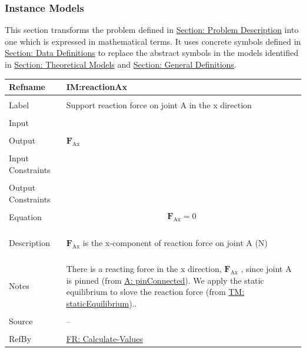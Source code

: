 \documentclass[12pt]{article}
\begin{document}
\subsubsection{Instance Models}
\label{Sec:IMs}
This section transforms the problem defined in \hyperref[Sec:ProbDesc]{Section: Problem Description} into one which is expressed in mathematical terms. It uses concrete symbols defined in \hyperref[Sec:DDs]{Section: Data Definitions} to replace the abstract symbols in the models identified in \hyperref[Sec:TMs]{Section: Theoretical Models} and \hyperref[Sec:GDs]{Section: General Definitions}.

\vspace{\baselineskip}
\noindent
\begin{minipage}{\textwidth}
\begin{tabular}{>{\raggedright}p{}>{\raggedright\arraybackslash}p{}}
\toprule \textbf{Refname} & \textbf{IM:reactionAx}
\label{IM:reactionAx}
\\ \midrule \\
Label & Support reaction force on joint A in the x direction
        
\\ \midrule \\
Input & 
\\ \midrule \\
Output & ${\mathbf{F}_{\text{Ax}}}$
         
\\ \midrule \\
Input Constraints & 
\\ \midrule \\
Output Constraints & 
\\ \midrule \\
Equation & \begin{displaymath}
           {\mathbf{F}_{\text{Ax}}}=0
           \end{displaymath}
\\ \midrule \\
Description & \begin{symbDescription}
              \item{${\mathbf{F}_{\text{Ax}}}$ is the x-component of reaction force on joint A (${\text{N}}$)}
              \end{symbDescription}
\\ \midrule \\
Notes & There is a reacting force in the x direction, ${\mathbf{F}_{\text{Ax}}}$ , since joint A is pinned (from \hyperref[pinConnected]{A: pinConnected}). We apply the static equilibrium to slove the reaction force (from \hyperref[TM:staticEquilibrium]{TM: staticEquilibrium})..
        
\\ \midrule \\
Source & --
         
\\ \midrule \\
RefBy & \hyperref[calcValues]{FR: Calculate-Values}
        
\\ \bottomrule
\end{tabular}
\end{minipage}
\end{document}
